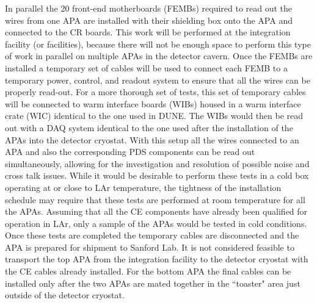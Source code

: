 In parallel the 20 front-end motherboards (FEMBs) required to read out the
wires from one APA are installed with their shielding box onto the APA and
connected to the CR boards. This work will be performed at the integration
facility (or facilities), because there will not be enough space to perform
this type of work in parallel on multiple APAs in the detector cavern. Once
the FEMBs are installed a temporary set of cables will be
used to connect each FEMB to a temporary power, control, and readout system
to ensure that all the wires can be properly read-out. For a more thorough
set of tests, this set of temporary cables will be connected to warm interface
boards (WIBs) housed in a warm interface crate (WIC) identical to the one
used in DUNE. The WIBs would then be read out with a DAQ system identical
to the one used after the installation of the APAs into the detector cryostat.
With this setup all the wires connected to an APA and also the corresponding
PDS components can be read out simultaneously, allowing for the investigation
and resolution of possible noise and cross talk issues. While it would be
desirable to perform these tests in a cold box operating at or close to LAr
temperature, the tightness of the installation schedule may require that these
tests are performed at room temperature for all the APAs. Assuming that all
the CE components have already been qualified for operation in LAr, only a
sample of the APAs would be tested in cold conditions. Once these tests
are completed the temporary cables are disconnected and the APA is prepared
for shipment to Sanford Lab. It is not considered feasible to transport the
top APA from the integration facility to the detector cryostat with the
CE cables already installed. For the bottom APA the final cables can be
installed only after the two APAs are mated together in the ``toaster" area
just outside of the detector cryostat.

